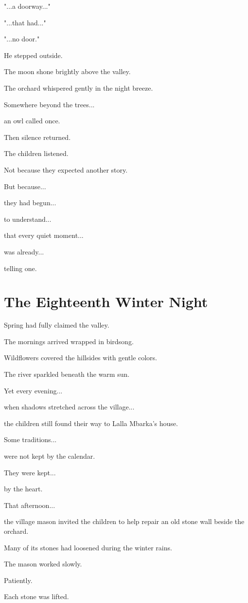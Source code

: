 \documentclass[12pt,openany]{book}
\begin{document}
"...a doorway..."

"...that had..."

"...no door."

He stepped outside.

The moon shone brightly above the valley.

The orchard whispered gently in the night breeze.

Somewhere beyond the trees...

an owl called once.

Then silence returned.

The children listened.

Not because they expected another story.

But because...

they had begun...

to understand...

that every quiet moment...

was already...

telling one.
\chapter{The Eighteenth Winter Night}

Spring had fully claimed the valley.

The mornings arrived wrapped in birdsong.

Wildflowers covered the hillsides with gentle colors.

The river sparkled beneath the warm sun.

Yet every evening...

when shadows stretched across the village...

the children still found their way to Lalla Mbarka's house.

Some traditions...

were not kept by the calendar.

They were kept...

by the heart.

That afternoon...

the village mason invited the children to help repair an old stone wall beside the orchard.

Many of its stones had loosened during the winter rains.

The mason worked slowly.

Patiently.

Each stone was lifted.
\end{document}
